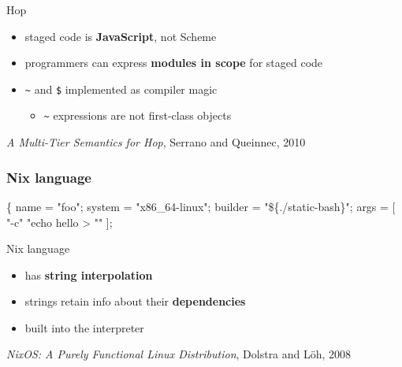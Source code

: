 \documentclass{beamer}
\newcommand{\highlight}[1]{\alert{\textbf{#1}}}
\begin{document}
\begin{frame}[fragile]{Hop}
  \begin{itemize}
  \item staged code is \highlight{JavaScript}, not Scheme
  \item programmers can express \highlight{modules in scope} for staged
    code
  \item{ \texttt{\~} and \texttt{\$} implemented as compiler magic
    \begin{itemize}
    \item \texttt{\~} expressions are not first-class objects
    \end{itemize}
  }
  \end{itemize}

  \vfill{}
  \small{
    \textit{A Multi-Tier Semantics for Hop}, Serrano and Queinnec, 2010
  }
\end{frame}

\begin{frame}[fragile]
  \frametitle{Nix language}

  \small{
    \begin{semiverbatim}
 \{
  name = "foo";
  system = "x86\_64-linux";
  builder = "\alert{\$\{./static-bash\}}";
  args = [ "-c" "echo hello > "" ];
    \end{semiverbatim}
  }

\end{frame}

\begin{frame}[fragile]{Nix language}
  \begin{itemize}
  \item has \highlight{string interpolation}
  \item strings retain info about their \highlight{dependencies}
  \item built into the interpreter
  \end{itemize}

  \vfill{} \small{ \textit{NixOS: A Purely Functional Linux
      Distribution}, Dolstra and Löh, 2008 }
\end{frame}
\end{document}
